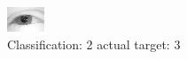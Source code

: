 \begin{figure}[h!]
\begin{center}
\includegraphics[width=0.60\columnwidth]{figures/ID2383_class_2_target_3.png}
\end{center}
\caption{ Classification: 2 actual target: 3}
\label{fig:ID2383_class_2_target_3}
\end{figure}
